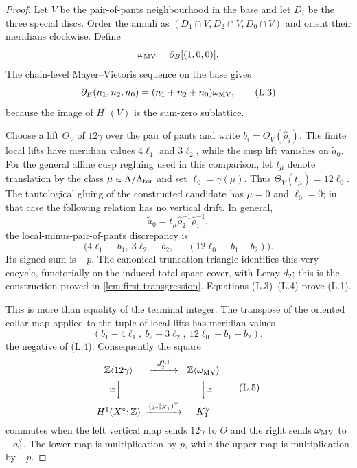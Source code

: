 \begin{proof}
Let $V$ be the pair-of-pants neighbourhood in the base and let
$D_i$ be the three special discs.  Order the annuli as
$(D_1\cap V,D_2\cap V,D_0\cap V)$ and orient their meridians clockwise.
Define
\[
 \omega_{\rm MV}=\partial_B[(1,0,0)].
\]
The chain-level Mayer--Vietoris sequence on the base gives
\[
 \partial_B(n_1,n_2,n_0)
 =(n_1+n_2+n_0)\omega_{\rm MV},
\tag{L.3}
\]
because the image of $H^1(V)$ is the sum-zero sublattice.

Choose a lift $\Theta_V$ of $12\gamma$ over the pair of pants and write
$b_i=\Theta_V(\widehat\rho_i)$.  The finite local lifts have meridian values
$4\ell_1$ and $3\ell_2$, while the cusp lift vanishes on
$\widetilde a_0$.  For the general affine cusp regluing used in this
comparison, let $t_\mu$ denote translation by the class
$\mu\in\Lambda/\Lambda_{\rm tor}$ and set
$\ell_0=\gamma(\mu)$.  Thus
$\Theta_V(t_\mu)=12\ell_0$.  The tautological gluing of the constructed
candidate has $\mu=0$ and $\ell_0=0$; in that case the following relation
has no vertical drift.  In general,
\[
 \widetilde a_0=t_\mu\widehat\rho_2^{-1}
                         \widehat\rho_1^{-1},
\]
the local-minus-pair-of-pants discrepancy is
\[
 \bigl(4\ell_1-b_1,\ 3\ell_2-b_2,\
 -(12\ell_0-b_1-b_2)\bigr).
\tag{L.4}
\]
Its signed sum is $-p$.  The canonical truncation triangle identifies this
very cocycle, functorially on the induced total-space cover, with Leray
$d_2$; this is the construction proved in
\cref{lem:first-transgression}.  Equations (L.3)--(L.4) prove (L.1).

This is more than equality of the terminal integer.  The transpose of the
oriented collar map applied to the tuple of local lifts has meridian values
\[
 (b_1-4\ell_1,\ b_2-3\ell_2,\
 12\ell_0-b_1-b_2),
\]
the negative of (L.4).  Consequently the square
\[
\begin{CD}
\mathbb Z\langle12\gamma\rangle
 @>{d_2^{0,1}}>>
\mathbb Z\langle\omega_{\rm MV}\rangle\\
@V{\cong}VV @VV{\cong}V\\
H^1(X^\circ;\mathbb Z)
@>{(j_*|_{K_1})^\vee}>>
K_1^\vee
\end{CD}
\tag{L.5}
\]
commutes when the left vertical map sends $12\gamma$ to $\Theta$ and the
right sends $\omega_{\rm MV}$ to $-\widetilde a_0^\vee$.  The lower map is
multiplication by $p$, while the upper map is multiplication by $-p$.


\end{proof}

